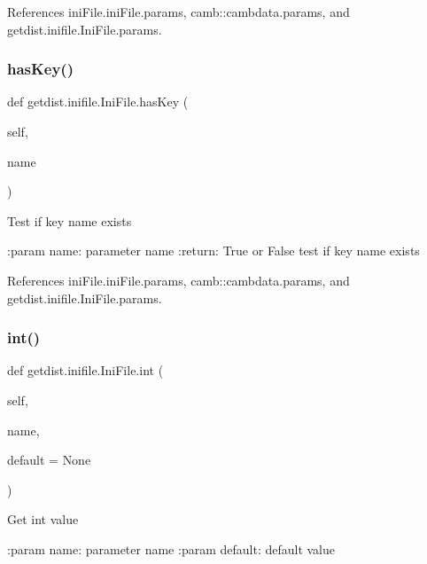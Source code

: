 References ini\+File.\+ini\+File.\+params, camb\+::cambdata.\+params, and getdist.\+inifile.\+Ini\+File.\+params.

\mbox{\label{classgetdist_1_1inifile_1_1IniFile_ae6ecdb2f829ec8651442ca4f7a2f85cc}} 
\subsubsection{\texorpdfstring{has\+Key()}{hasKey()}}
{\footnotesize\ttfamily def getdist.\+inifile.\+Ini\+File.\+has\+Key (\begin{DoxyParamCaption}\item[{}]{self,  }\item[{}]{name }\end{DoxyParamCaption})}

\begin{DoxyVerb}Test if key name exists

:param name: parameter name
:return: True or False test if key name exists
\end{DoxyVerb}
 

References ini\+File.\+ini\+File.\+params, camb\+::cambdata.\+params, and getdist.\+inifile.\+Ini\+File.\+params.

\mbox{\label{classgetdist_1_1inifile_1_1IniFile_a5b90359abae63c212ee90f077abe8ad9}} 
\subsubsection{\texorpdfstring{int()}{int()}}
{\footnotesize\ttfamily def getdist.\+inifile.\+Ini\+File.\+int (\begin{DoxyParamCaption}\item[{}]{self,  }\item[{}]{name,  }\item[{}]{default = {\ttfamily None} }\end{DoxyParamCaption})}

\begin{DoxyVerb}Get int value

:param name: parameter name
:param default: default value
\end{DoxyVerb}
 

